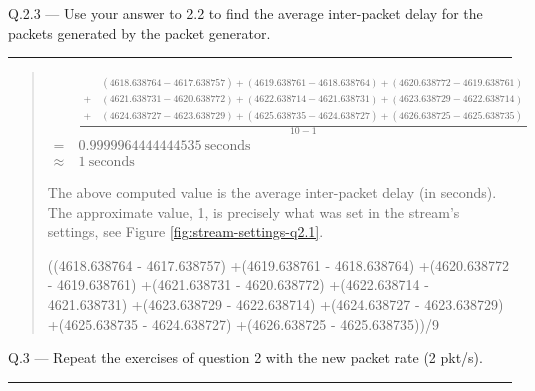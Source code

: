\documentclass{article}
\newcommand\Que[2]{%
   \begin{samepage}
   \leavevmode\par
   \noindent
   Q.#1 --- #2\par\vspace{10pt}\hrule\vspace{10pt}
   \end{samepage}}
\newenvironment{ans}
   {\fbox{Answer}\begin{quote}}
   {\end{quote}}
\begin{document}
\Que{2.3}{Use your answer to 2.2 to find the average
inter-packet delay for the packets generated by the packet
generator.}
\begin{ans}

$$
\begin{aligned}
&\frac{
\begin{aligned}
&(4618.638764 - 4617.638757)
+(4619.638761 - 4618.638764)
+(4620.638772 - 4619.638761)\\
+\ &(4621.638731 - 4620.638772)
+(4622.638714 - 4621.638731)
+(4623.638729 - 4622.638714)\\
+\ &(4624.638727 - 4623.638729)
+(4625.638735 - 4624.638727)
+(4626.638725 - 4625.638735)
\end{aligned}
}{10 - 1}\\
=\ & 0.9999964444444535\ \text{seconds}\\
\approx\ & 1\ \text{seconds}
\end{aligned}
 $$

 The above computed value is the average inter-packet delay (in
 seconds). The approximate value, 1, is precisely what was set
 in the stream's settings, see Figure
 \ref{fig:stream-settings-q2.1}.

\begin{gruvboxlisting}[language=Python, caption={Python
   expression for calculating the inter-packet delay for
Question 2.3.}]
((4618.638764 - 4617.638757)
+(4619.638761 - 4618.638764)
+(4620.638772 - 4619.638761)
+(4621.638731 - 4620.638772)
+(4622.638714 - 4621.638731)
+(4623.638729 - 4622.638714)
+(4624.638727 - 4623.638729)
+(4625.638735 - 4624.638727)
+(4626.638725 - 4625.638735))/9
\end{gruvboxlisting}

\end{ans}

\Que{3}{Repeat the exercises of question 2 with the new packet
rate (2 pkt/s).}
\end{document}
